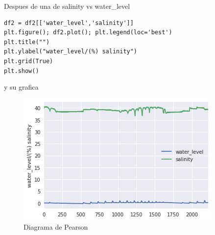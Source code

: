 \documentclass{article}
\begin{document}
Despues de una de salinity vs water\_level
\begin{verbatim}
df2 = df2[['water_level','salinity']]
plt.figure(); df2.plot(); plt.legend(loc='best')
plt.title("")
plt.ylabel("water_level/(%) salinity")
plt.grid(True)
plt.show()
\end{verbatim}
y su grafica

\begin{figure}[h]
\centering
\includegraphics[scale=0.5]{dos.png}
\caption{Diagrama de Pearson}
\end{figure}
\end{document}
